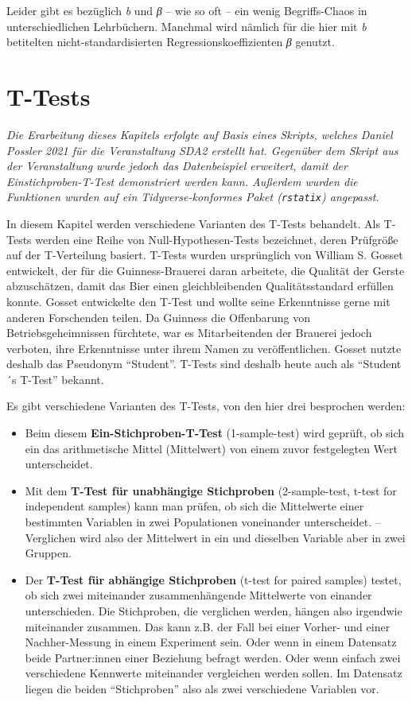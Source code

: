 \documentclass[
]{book}
\begin{document}
Leider gibt es bezüglich \emph{b} und \emph{β} -- wie so oft -- ein wenig Begriffs-Chaos in unterschiedlichen Lehrbüchern. Manchmal wird nämlich für die hier mit \emph{b} betitelten nicht-standardisierten Regressionskoeffizienten \emph{β} genutzt.

\hypertarget{t-tests}{%
\chapter{T-Tests}\label{t-tests}}

\emph{Die Erarbeitung dieses Kapitels erfolgte auf Basis eines Skripts, welches Daniel Possler 2021 für die Veranstaltung SDA2 erstellt hat. Gegenüber dem Skript aus der Veranstaltung wurde jedoch das Datenbeispiel erweitert, damit der Einstichproben-T-Test demonstriert werden kann. Außerdem wurden die Funktionen wurden auf ein Tidyverse-konformes Paket (\texttt{rstatix}) angepasst.}

In diesem Kapitel werden verschiedene Varianten des T-Tests behandelt.
Als T-Tests werden eine Reihe von Null-Hypothesen-Tests bezeichnet, deren Prüfgröße auf der T-Verteilung basiert.
T-Tests wurden ursprünglich von William S. Gosset entwickelt, der für die Guinness-Brauerei daran arbeitete, die Qualität der Gerste abzuschätzen, damit das Bier einen gleichbleibenden Qualitätsstandard erfüllen konnte.
Gosset entwickelte den T-Test und wollte seine Erkenntnisse gerne mit anderen Forschenden teilen.
Da Guinness die Offenbarung von Betriebsgeheimnissen fürchtete, war es Mitarbeitenden der Brauerei jedoch verboten, ihre Erkenntnisse unter ihrem Namen zu veröffentlichen.
Gosset nutzte deshalb das Pseudonym ``Student''.
T-Tests sind deshalb heute auch als ``Student´s T-Test'' bekannt.

Es gibt verschiedene Varianten des T-Tests, von den hier drei besprochen werden:

\begin{itemize}
\item
  Beim diesem \textbf{Ein-Stichproben-T-Test} (1-sample-test) wird geprüft, ob sich ein das arithmetische Mittel (Mittelwert) von einem zuvor festgelegten Wert unterscheidet.
\item
  Mit dem \textbf{T-Test für unabhängige Stichproben} (2-sample-test, t-test for independent samples) kann man prüfen, ob sich die Mittelwerte einer bestimmten Variablen in zwei Populationen voneinander unterscheidet. -- Verglichen wird also der Mittelwert in ein und dieselben Variable aber in zwei Gruppen.
\item
  Der \textbf{T-Test für abhängige Stichproben} (t-test for paired samples) testet, ob sich zwei miteinander zusammenhängende Mittelwerte von einander unterschieden. Die Stichproben, die verglichen werden, hängen also irgendwie miteinander zusammen. Das kann z.B. der Fall bei einer Vorher- und einer Nachher-Messung in einem Experiment sein. Oder wenn in einem Datensatz beide Partner:innen einer Beziehung befragt werden. Oder wenn einfach zwei verschiedene Kennwerte miteinander vergleichen werden sollen. Im Datensatz liegen die beiden ``Stichproben'' also als zwei verschiedene Variablen vor.
\end{itemize}
\end{document}
